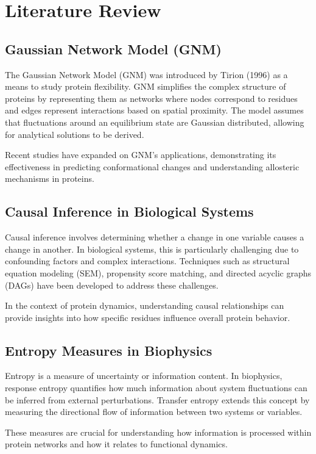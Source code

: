 \documentclass{report}  %
\begin{document}
\chapter{Literature Review}

\section{Gaussian Network Model (GNM)}
The Gaussian Network Model (GNM) was introduced by Tirion (1996) as a means to study protein flexibility. GNM simplifies the complex structure of proteins by representing them as networks where nodes correspond to residues and edges represent interactions based on spatial proximity. The model assumes that fluctuations around an equilibrium state are Gaussian distributed, allowing for analytical solutions to be derived.

Recent studies have expanded on GNM's applications, demonstrating its effectiveness in predicting conformational changes and understanding allosteric mechanisms in proteins.

\section{Causal Inference in Biological Systems}
Causal inference involves determining whether a change in one variable causes a change in another. In biological systems, this is particularly challenging due to confounding factors and complex interactions. Techniques such as structural equation modeling (SEM), propensity score matching, and directed acyclic graphs (DAGs) have been developed to address these challenges.

In the context of protein dynamics, understanding causal relationships can provide insights into how specific residues influence overall protein behavior.

\section{Entropy Measures in Biophysics}
Entropy is a measure of uncertainty or information content. In biophysics, response entropy quantifies how much information about system fluctuations can be inferred from external perturbations. Transfer entropy extends this concept by measuring the directional flow of information between two systems or variables.

These measures are crucial for understanding how information is processed within protein networks and how it relates to functional dynamics.
\end{document}
